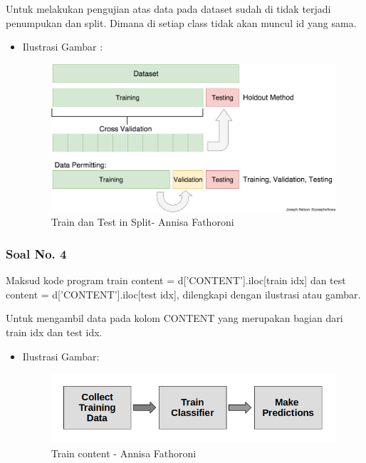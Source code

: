 Untuk melakukan pengujian atas data pada dataset sudah di tidak terjadi penumpukan dan split. Dimana di setiap class tidak akan muncul id yang sama.

\begin{itemize}
\item Ilustrasi Gambar :

\begin{figure}[!hbtp]
\centering
\includegraphics[scale=0.2]{figures/Chapter 7/1164067/Teori/Chapter7AnnisaFathoroni3.png}
\caption{Train dan Test in Split- Annisa Fathoroni}
\label{Train dan Test in Split- Annisa Fathoroni}
\end{figure}

\end{itemize}

\subsubsection{Soal No. 4}
Maksud kode program train content = d[’CONTENT’].iloc[train idx] dan test content = d[’CONTENT’].iloc[test idx], dilengkapi dengan ilustrasi atau gambar.

Untuk mengambil data pada kolom  CONTENT yang merupakan bagian dari train idx dan test idx.

\begin{itemize}
\item Ilustrasi Gambar:

\begin{figure}[!hbtp]
\centering
\includegraphics[scale=0.4]{figures/Chapter 7/1164067/Teori/Chapter7AnnisaFathoroni4.png}
\caption{Train content - Annisa Fathoroni}
\label{Train content - Annisa Fathoroni}
\end{figure}

\end{itemize}

